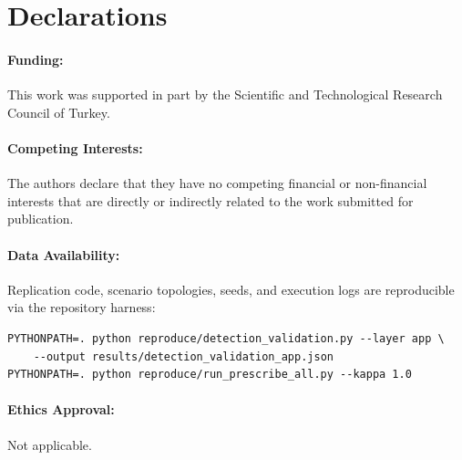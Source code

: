 \section*{Declarations}

\paragraph{Funding:} This work was supported in part by the Scientific and Technological Research Council of Turkey.

\paragraph{Competing Interests:} The authors declare that they have no competing financial or non-financial interests that are directly or indirectly related to the work submitted for publication.

\paragraph{Data Availability:} Replication code, scenario topologies, seeds, and execution logs are reproducible via the repository harness:
\begin{verbatim}
PYTHONPATH=. python reproduce/detection_validation.py --layer app \
    --output results/detection_validation_app.json
PYTHONPATH=. python reproduce/run_prescribe_all.py --kappa 1.0
\end{verbatim}

\paragraph{Ethics Approval:} Not applicable.
